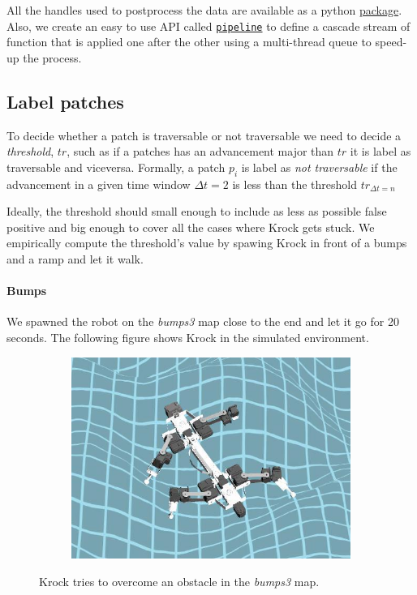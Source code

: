 \documentclass[../document.tex]{subfiles}
\begin{document}
All the handles used to postprocess the data are available as a python \href{https://github.com/FrancescoSaverioZuppichini/Master-Thesis/tree/master/core/utilities/postprocessing/handlers}{package}. Also, we create an easy to use API called \href{https://github.com/FrancescoSaverioZuppichini/Master-Thesis/tree/master/core/utilities/pipeline}{\texttt{pipeline}} to define a cascade stream of function that is applied one after the other using a multi-thread queue to speed-up the process.

\subsection{Label patches}
To decide whether a patch is traversable or not traversable we need to decide a \emph{threshold}, $tr$, such as if a patches has an advancement major than $tr$ it is label as traversable and viceversa. Formally, a patch $p_i$ is label as \emph{not traversable} if the advancement in a given time window $\Delta t = 2$ is less than the threshold $tr_{\Delta t = n}$

Ideally, the threshold should small enough to include as less as possible false positive and big enough to cover all the cases where Krock gets stuck. We empirically compute the threshold's value by spawing Krock in front of a bumps and a ramp and let it walk.
\paragraph{Bumps} We spawned the robot on the \emph{bumps3} map close to the end and let it go for 20 seconds. The following figure shows Krock in the simulated environment.

\begin{figure}[htbp]
\centering
    \begin{subfigure}[b]{0.45\textwidth}
    \includegraphics[width=\linewidth]{../img/3/find_tr/krock-bumps.jpg}
    \end{subfigure}
\caption{Krock tries to overcome an obstacle in the \emph{bumps3} map.}
\end{figure}
\end{document}

